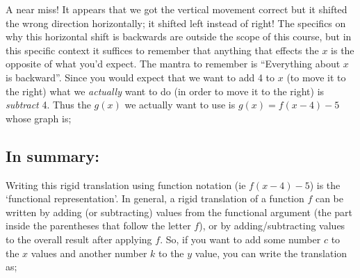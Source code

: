 \documentclass{ximera}
\begin{document}
    A near miss! It appears that we got the vertical movement correct but it shifted the wrong direction horizontally; it shifted left instead of right! The specifics on why this horizontal shift is backwards are outside the scope of this course, but in this specific context it suffices to remember that anything that effects the $x$ is the opposite of what you'd expect. The mantra to remember is ``Everything about $x$ is backward''. Since you would expect that we want to add 4 to $x$ (to move it to the right) what we \textit{actually} want to do (in order to move it to the right) is \textit{subtract} 4. Thus the $g(x)$ we actually want to use is $g(x) = f(x-4)-5$ whose graph is;
    
    \begin{minipage}{\textwidth}
        \begin{center}
        \end{center}
    \end{minipage}
    
    \subsection*{In summary:}
    
    Writing this rigid translation using function notation (ie $f(x-4)-5$) is the `functional representation'. In general, a rigid translation of a function $f$ can be written by adding (or subtracting) values from the functional argument (the part inside the parentheses that follow the letter $f$), or by adding/subtracting values to the overall result after applying $f$. So, if you want to add some number $c$ to the $x$ values and another number $k$ to the $y$ value, you can write the translation as;
    
\end{document}
